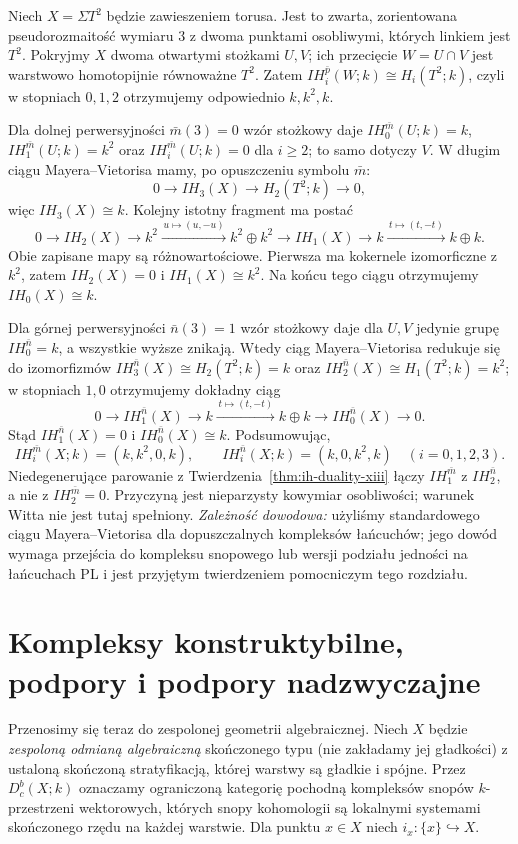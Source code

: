 \begin{przyklad}
\label{ex:suspension-torus-xiii}
Niech $X=\Sigma T^2$ będzie zawieszeniem torusa.
Jest to zwarta, zorientowana pseudorozmaitość wymiaru $3$
z dwoma punktami osobliwymi, których linkiem jest $T^2$.
Pokryjmy $X$ dwoma otwartymi stożkami $U,V$; ich
przecięcie $W=U\cap V$ jest warstwowo homotopijnie
równoważne $T^2$. Zatem
$IH_i^{\bar p}(W;k)\cong H_i(T^2;k)$, czyli
w stopniach $0,1,2$ otrzymujemy odpowiednio $k,k^2,k$.

Dla dolnej perwersyjności $\bar m(3)=0$ wzór
stożkowy daje
$IH_0^{\bar m}(U;k)=k$,
$IH_1^{\bar m}(U;k)=k^2$ oraz
$IH_i^{\bar m}(U;k)=0$ dla $i\ge2$;
to samo dotyczy $V$. W długim ciągu
Mayera--Vietorisa mamy, po opuszczeniu
symbolu $\bar m$:
\[
0\longrightarrow IH_3(X)\longrightarrow
H_2(T^2;k)\longrightarrow0,
\]
więc $IH_3(X)\cong k$. Kolejny istotny
fragment ma postać
\[
0\longrightarrow IH_2(X)\longrightarrow
k^2\xrightarrow{\,u\mapsto(u,-u)\,}k^2\oplus k^2
\longrightarrow IH_1(X)\longrightarrow
k\xrightarrow{\,t\mapsto(t,-t)\,}k\oplus k.
\]
Obie zapisane mapy są różnowartościowe.
Pierwsza ma kokernele izomorficzne z $k^2$,
zatem $IH_2(X)=0$ i $IH_1(X)\cong k^2$.
Na końcu tego ciągu otrzymujemy $IH_0(X)\cong k$.

Dla górnej perwersyjności $\bar n(3)=1$ wzór
stożkowy daje dla $U,V$ jedynie grupę
$IH_0^{\bar n}=k$, a wszystkie wyższe znikają.
Wtedy ciąg Mayera--Vietorisa redukuje się
do izomorfizmów
$IH_3^{\bar n}(X)\cong H_2(T^2;k)=k$ oraz
$IH_2^{\bar n}(X)\cong H_1(T^2;k)=k^2$;
w stopniach $1,0$ otrzymujemy dokładny ciąg
\[
0\longrightarrow IH_1^{\bar n}(X)
\longrightarrow k\xrightarrow{\,t\mapsto(t,-t)\,}
k\oplus k\longrightarrow IH_0^{\bar n}(X)
\longrightarrow0.
\]
Stąd $IH_1^{\bar n}(X)=0$ i
$IH_0^{\bar n}(X)\cong k$.
Podsumowując,
\[
IH_i^{\bar m}(X;k)=(k,k^2,0,k),\qquad
IH_i^{\bar n}(X;k)=(k,0,k^2,k)
\quad (i=0,1,2,3).
\]
Niedegenerujące parowanie z
Twierdzenia~\ref{thm:ih-duality-xiii} łączy
$IH_1^{\bar m}$ z $IH_2^{\bar n}$,
a nie z $IH_2^{\bar m}=0$.
Przyczyną jest nieparzysty kowymiar osobliwości;
warunek Witta nie jest tutaj spełniony.
\emph{Zależność dowodowa:} użyliśmy standardowego
ciągu Mayera--Vietorisa dla dopuszczalnych kompleksów
łańcuchów; jego dowód wymaga przejścia do
kompleksu snopowego lub wersji podziału jedności
na łańcuchach PL i jest przyjętym twierdzeniem
pomocniczym tego rozdziału.
\end{przyklad}

\section{Kompleksy konstruktybilne, podpory i podpory nadzwyczajne}
Przenosimy się teraz do zespolonej geometrii
algebraicznej. Niech $X$ będzie \emph{zespoloną odmianą
algebraiczną} skończonego typu (nie zakładamy jej
gładkości) z ustaloną skończoną
stratyfikacją, której warstwy są gładkie i spójne.
Przez $D_c^b(X;k)$ oznaczamy ograniczoną kategorię
pochodną kompleksów snopów $k$-przestrzeni wektorowych,
których snopy kohomologii są lokalnymi systemami
skończonego rzędu na każdej warstwie.
Dla punktu $x\in X$ niech $i_x:\{x\}\hookrightarrow X$.

